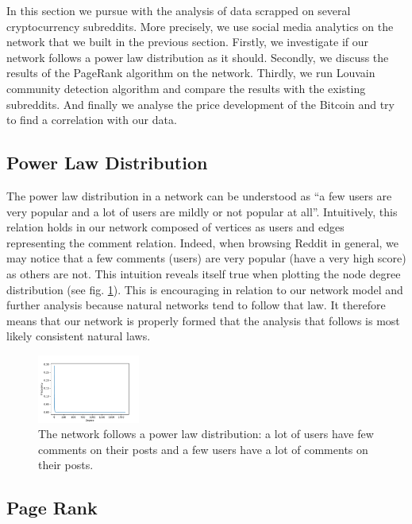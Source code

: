 In this section we pursue with the analysis of data scrapped on several cryptocurrency subreddits. More precisely, we use social media analytics on the network that we built in the previous section. Firstly, we investigate if our network follows a power law distribution as it should. Secondly, we discuss the results of the PageRank algorithm on the network. Thirdly, we run Louvain community detection algorithm and compare the results with the existing subreddits. And finally we analyse the price development of the Bitcoin and try to find a correlation with our data.

\subsection{Power Law Distribution}

The power law distribution in a network can be understood as ``a few users are very popular and a lot of users are mildly or not popular at all''. Intuitively, this relation holds in our network composed of vertices as users and edges representing the comment relation. Indeed, when browsing Reddit in general, we may notice that a few comments (users) are very popular (have a very high score) as others are not. This intuition reveals itself true when plotting the node degree distribution (see fig. \ref{fig:degdist}). This is encouraging in relation to our network model and further analysis because natural networks tend to follow that law. It therefore means that our network is properly formed that the analysis that follows is most likely consistent natural laws.
\begin{figure}[H]
    \centering
    \includegraphics[width=0.3\textwidth]{figures/deg_dist.pdf}
    \caption{The network follows a power law distribution: a lot of users have few comments on their posts and a few users have a lot of comments on their posts.}
    \label{fig:degdist}
\end{figure}



\subsection{Page Rank}

